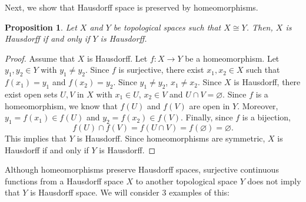 \documentclass[a4paper, openany]{memoir}
\theoremstyle{definition}
\theoremstyle{plain}
\newtheorem{proposition}[definition]{Proposition}
\begin{document}
Next, we show that Hausdorff space is preserved by homeomorphisms.
\begin{proposition}
Let $X$ and $Y$ be topological spaces such that $X \cong Y$. Then, $X$ is Hausdorff if and only if $Y$ is Hausdorff.
\end{proposition}
\begin{proof}
Assume that $X$ is Hausdorff. Let $f: X \to Y$ be a homeomorphism. Let $y_1, y_2 \in Y$ with $y_1 \neq y_2$. Since $f$ is surjective, there exist $x_1, x_2 \in X$ such that $f(x_1) = y_1$ and $f(x_2) = y_2$. Since $y_1 \neq y_2$, $x_1 \neq x_2$. Since $X$ is Hausdorff, there exist open sets $U, V$ in $X$ with $x_1 \in U$, $x_2 \in V$ and $U \cap V = \varnothing$. Since $f$ is a homeomorphism, we know that $f(U)$ and $f(V)$ are open in $Y$. Moreover, $y_1 = f(x_1) \in f(U)$ and $y_2 = f(x_2) \in f(V)$. Finally, since $f$ is a bijection,
\[f(U) \cap f(V) = f(U \cap V) = f(\varnothing) = \varnothing.\]
This implies that $Y$ is Hausdorff. Since homeomorphisms are symmetric, $X$ is Hausdorff if and only if $Y$ is Hausdorff.
\end{proof}
\noindent Although homeomorphisms preserve Hausdorff spaces, surjective continuous functions from a Hausdorff space $X$ to another topological space $Y$ does not imply that $Y$ is Hausdorff space. We will consider 3 examples of this:
\end{document}
